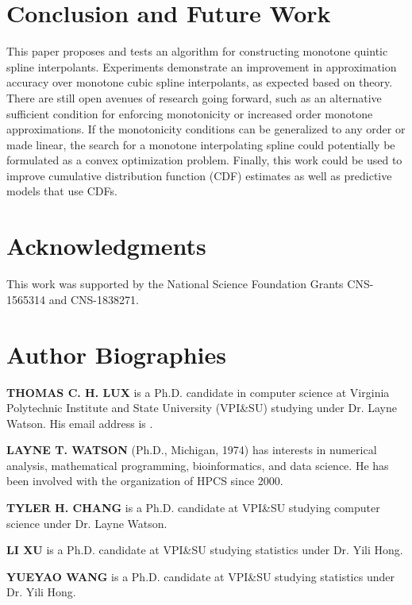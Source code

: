 \documentclass{scspaperproc}
\theoremstyle{scsthe}
\begin{document}
\section{Conclusion and Future Work}
\label{sec:conclusion}

This paper proposes and tests an algorithm for constructing monotone quintic spline interpolants. Experiments demonstrate an improvement in approximation accuracy over monotone cubic spline interpolants, as expected based on theory. There are still open avenues of research going forward, such as an alternative sufficient condition for enforcing monotonicity or increased order monotone approximations. If the monotonicity conditions can be generalized to any order or made linear, the search for a monotone interpolating spline could potentially be formulated as a convex optimization problem. Finally, this work could be used to improve cumulative distribution function (CDF) estimates as well as predictive models that use CDFs.


\section*{Acknowledgments}
This work was supported by the National Science Foundation Grants CNS-1565314 and CNS-1838271.





\section*{Author Biographies}

\textbf{\uppercase{THOMAS C. H. LUX}} is a Ph.D. candidate in computer
science at Virginia Polytechnic Institute and State University
(VPI\&SU) studying under Dr. Layne Watson. His email address is
.

\textbf{\uppercase{Layne T. Watson}} (Ph.D., Michigan, 1974) has
interests in numerical analysis, mathematical programming,
bioinformatics, and data science.  He has been involved with the
organization of HPCS since 2000.

\textbf{\uppercase{Tyler H. Chang}} is a Ph.D. candidate at VPI\&SU
studying computer science under Dr. Layne Watson.

\textbf{\uppercase{Li Xu}} is a Ph.D. candidate at VPI\&SU studying
statistics under Dr. Yili Hong.

\textbf{\uppercase{Yueyao Wang}} is a Ph.D. candidate at VPI\&SU
studying statistics under Dr. Yili Hong.
\end{document}

